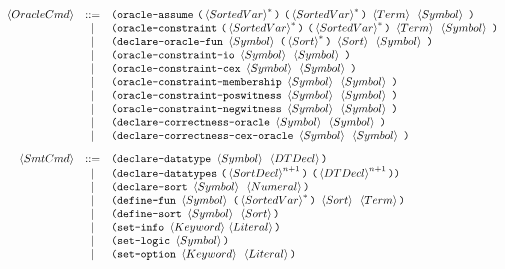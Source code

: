 \documentclass[english,a4paper,10pt]{article}
\begin{document}
\[
\begin{array}{rcl}  
 \oraclecmd 
 & ::= & \paren{\assumeoraclekwd\mbox{ }\paren{\kstar{\sortedvar}}\mbox{ }\paren{\kstar{\sortedvar}}\mbox{ }
  \term \mbox{ } \symbol\mbox{ }} \\
  & | & \paren{\constraintoraclekwd\mbox{ }\paren{\kstar{\sortedvar}}\mbox{ }\paren{\kstar{\sortedvar}}\mbox{ }
  \term\mbox{ } \symbol\mbox{ }} \\
 & | & \paren{\oracledeckwd\mbox{ }\symbol\mbox{ }\paren{\kstar{\sortexpr}}\mbox{ }\sortexpr\mbox{ }\symbol\mbox{ }} \\
 & | &\paren{\iooracledeckwd\mbox{ }\symbol\mbox{ } \symbol\mbox{ }} \\
 & | &\paren{\cexoracledeckwd\mbox{ }\symbol\mbox{ } \symbol\mbox{ }} \\
 & | &\paren{\memoracledeckwd\mbox{ }\symbol\mbox{ } \symbol\mbox{ }} \\
 & | &\paren{\poswitnessoracledeckwd\mbox{ }\symbol\mbox{ } \symbol\mbox{ }} \\
 & | &\paren{\negwitnessoracledeckwd\mbox{ }\symbol\mbox{ } \symbol\mbox{ }} \\
 & | &\paren{\corroracledeckwd\mbox{ }\symbol\mbox{ } \symbol\mbox{ }} \\
 & | &\paren{\corrcexoracledeckwd\mbox{ }\symbol\mbox{ } \symbol\mbox{ }} \\[2ex]

 \smtcmd 
 & ::= &\paren{\dtdeclkwd\mbox{ }\symbol\mbox{ }\dtdecl} \\
 & | & \paren{\dtsdeclkwd\mbox{ }\paren{\kstarn{\sortdecl}{n+1} }\mbox{ }\paren{\kstarn{\dtdecl}{n+1}}} \\
 & | & \paren{\sortdeclkwd\mbox{ }\symbol\mbox{ }\intconst} \\
 & | & \paren{\fundefkwd\mbox{ }\symbol\mbox{ }\paren{\kstar{\sortedvar}}\mbox{ }\sortexpr\mbox{ }\term} \\  %
 & | & \paren{\sortdefkwd\mbox{ }\symbol\mbox{ }\sortexpr} \\
 & | & \paren{\setinfokwd\mbox{ }\keyword{ }\literal} \\
 & | & \paren{\setlogickwd\mbox{ }\symbol} \\
 & | & \paren{\setoptkwd\mbox{ }\keyword\mbox{ }\literal}\\[2ex]



\end{array}\]
\end{document}
